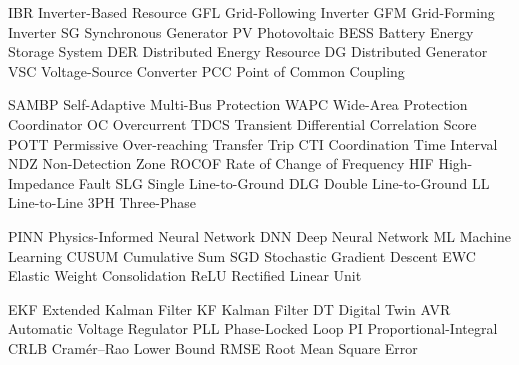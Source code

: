 
   {IBR}   {Inverter-Based Resource}
   {GFL}   {Grid-Following Inverter}
   {GFM}   {Grid-Forming Inverter}
    {SG}    {Synchronous Generator}
    {PV}    {Photovoltaic}
  {BESS}  {Battery Energy Storage System}
   {DER}   {Distributed Energy Resource}
    {DG}    {Distributed Generator}
   {VSC}   {Voltage-Source Converter}
   {PCC}   {Point of Common Coupling}

 {SAMBP} {Self-Adaptive Multi-Bus Protection}
  {WAPC}  {Wide-Area Protection Coordinator}
    {OC}    {Overcurrent}
  {TDCS}  {Transient Differential Correlation Score}
  {POTT}  {Permissive Over-reaching Transfer Trip}
   {CTI}   {Coordination Time Interval}
   {NDZ}   {Non-Detection Zone}
 {ROCOF} {Rate of Change of Frequency}
   {HIF}   {High-Impedance Fault}
   {SLG}   {Single Line-to-Ground}
   {DLG}   {Double Line-to-Ground}
    {LL}    {Line-to-Line}
   {3PH}   {Three-Phase}

  {PINN}  {Physics-Informed Neural Network}
   {DNN}   {Deep Neural Network}
    {ML}    {Machine Learning}
 {CUSUM} {Cumulative Sum}
   {SGD}   {Stochastic Gradient Descent}
   {EWC}   {Elastic Weight Consolidation}
  {ReLU}  {Rectified Linear Unit}

   {EKF}   {Extended Kalman Filter}
    {KF}    {Kalman Filter}
    {DT}    {Digital Twin}
   {AVR}   {Automatic Voltage Regulator}
   {PLL}   {Phase-Locked Loop}
    {PI}    {Proportional-Integral}
  {CRLB}  {Cram\'{e}r--Rao Lower Bound}
  {RMSE}  {Root Mean Square Error}


